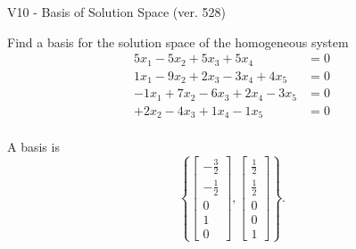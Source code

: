 \begin{exercise}
  \begin{exerciseTitle}V10 - Basis of Solution Space (ver. 528)\end{exerciseTitle}
  \begin{exerciseStatement}
    Find a basis for the solution space of the homogeneous system 
\begin{align*}
 5 x_ 1 -5 x_ 2 + 5 x_ 3 + 5 x_ 4 &= 0  \\ 
  1 x_ 1 -9 x_ 2 + 2 x_ 3 -3 x_ 4 + 4 x_ 5 &= 0  \\ 
  -1 x_ 1 + 7 x_ 2 -6 x_ 3 + 2 x_ 4 -3 x_ 5 &= 0  \\ 
  + 2 x_ 2 -4 x_ 3 + 1 x_ 4 -1 x_ 5 &= 0  \\ 
 \end{align*}


 
  \end{exerciseStatement}

  \begin{exerciseAnswer}
   A basis is   
\[\left\{\left[\begin{array}{c}
-\frac{3}{2} \\
-\frac{1}{2} \\
0 \\
1 \\
0
\end{array}\right] , \left[\begin{array}{c}
\frac{1}{2} \\
\frac{1}{2} \\
0 \\
0 \\
1
\end{array}\right]\right\}.\]

  


  \end{exerciseAnswer}
\end{exercise}